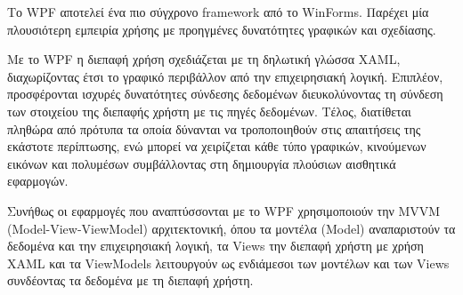 Το WPF αποτελεί ένα πιο σύγχρονο framework από το WinForms. Παρέχει μία πλουσιότερη εμπειρία χρήσης
με προηγμένες δυνατότητες γραφικών και σχεδίασης.

Με το WPF η διεπαφή χρήση σχεδιάζεται με τη δηλωτική γλώσσα XAML, διαχωρίζοντας έτσι το γραφικό 
περιβάλλον από την επιχειρησιακή λογική. Επιπλέον, προσφέρονται ισχυρές δυνατότητες σύνδεσης 
δεδομένων διευκολύνοντας τη σύνδεση των στοιχείου της διεπαφής χρήστη με τις πηγές δεδομένων.
Τέλος, διατίθεται πληθώρα από πρότυπα τα οποία δύνανται να τροποποιηθούν στις απαιτήσεις της
εκάστοτε περίπτωσης, ενώ μπορεί να χειρίζεται κάθε τύπο γραφικών, κινούμενων εικόνων και πολυμέσων
συμβάλλοντας στη δημιουργία πλούσιων αισθητικά εφαρμογών.

Συνήθως οι εφαρμογές που αναπτύσσονται με το WPF χρησιμοποιούν την MVVM (Model-View-ViewModel) 
αρχιτεκτονική, όπου τα μοντέλα (Model) αναπαριστούν τα δεδομένα και την επιχειρησιακή λογική,
τα Views την διεπαφή χρήστη με χρήση XAML και τα ViewModels λειτουργούν ως ενδιάμεσοι των μοντέλων
και των Views συνδέοντας τα δεδομένα με τη διεπαφή χρήστη.
